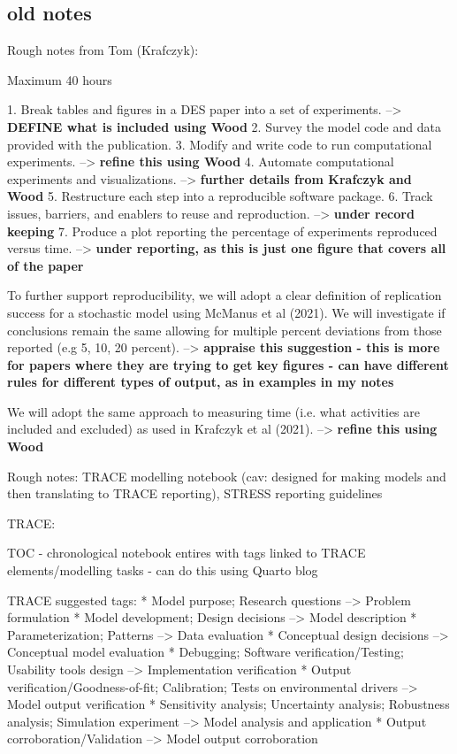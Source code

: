 \subsection{old notes}

Rough notes from Tom (Krafczyk):

Maximum 40 hours

1. Break tables and figures in a DES paper into a set of experiments. --> \textbf{DEFINE what is included using Wood}
2. Survey the model code and data provided with the publication. 
3. Modify and write code to run computational experiments. --> \textbf{refine this using Wood}
4. Automate computational experiments and visualizations. --> \textbf{further details from Krafczyk and Wood}
5. Restructure each step into a reproducible software package.
6. Track issues, barriers, and enablers to reuse and reproduction. --> \textbf{under record keeping}
7. Produce a plot reporting the percentage of experiments reproduced versus time. --> \textbf{under reporting, as this is just one figure that covers all of the paper}

To further support reproducibility, we will adopt a clear definition of replication success for a stochastic model using McManus et al (2021). We will investigate if conclusions remain the same allowing for multiple percent deviations from those reported (e.g 5, 10, 20 percent). --> \textbf{appraise this suggestion - this is more for papers where they are trying to get key figures - can have different rules for different types of output, as in examples in my notes}

We will adopt the same approach to measuring time (i.e. what activities are included and excluded) as used in Krafczyk et al (2021). --> \textbf{refine this using Wood}

Rough notes: TRACE modelling notebook (cav: designed for making models and then translating to TRACE reporting), STRESS reporting guidelines

TRACE:

TOC - chronological notebook entires with tags linked to TRACE elements/modelling tasks - can do this using Quarto blog

TRACE suggested tags:
* Model purpose; Research questions --> Problem formulation
* Model development; Design decisions --> Model description
* Parameterization; Patterns --> Data evaluation
* Conceptual design decisions --> Conceptual model evaluation
* Debugging; Software verification/Testing; Usability tools design --> Implementation verification
* Output verification/Goodness-of-fit; Calibration; Tests on environmental drivers --> Model output verification
* Sensitivity analysis; Uncertainty analysis; Robustness analysis; Simulation experiment --> Model analysis and application
* Output corroboration/Validation --> Model output corroboration


